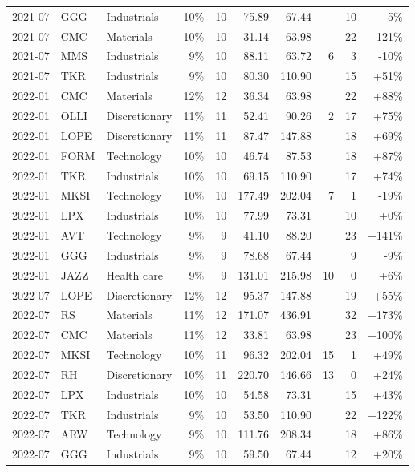 \documentclass[11pt,a4paper]{article}
\begin{document}
{\begin{longtable}{l l l r r r r r r r}
2021-07 & GGG & Industrials & 10\% & 10 & 75.89 & 67.44 &  & 10 & -5\% \\
2021-07 & CMC & Materials & 10\% & 10 & 31.14 & 63.98 &  & 22 & +121\% \\
2021-07 & MMS & Industrials & 9\% & 10 & 88.11 & 63.72 & 6 & 3 & -10\% \\
2021-07 & TKR & Industrials & 9\% & 10 & 80.30 & 110.90 &  & 15 & +51\% \\
2022-01 & CMC & Materials & 12\% & 12 & 36.34 & 63.98 &  & 22 & +88\% \\
2022-01 & OLLI & Discretionary & 11\% & 11 & 52.41 & 90.26 & 2 & 17 & +75\% \\
2022-01 & LOPE & Discretionary & 11\% & 11 & 87.47 & 147.88 &  & 18 & +69\% \\
2022-01 & FORM & Technology & 10\% & 10 & 46.74 & 87.53 &  & 18 & +87\% \\
2022-01 & TKR & Industrials & 10\% & 10 & 69.15 & 110.90 &  & 17 & +74\% \\
2022-01 & MKSI & Technology & 10\% & 10 & 177.49 & 202.04 & 7 & 1 & -19\% \\
2022-01 & LPX & Industrials & 10\% & 10 & 77.99 & 73.31 &  & 10 & +0\% \\
2022-01 & AVT & Technology & 9\% & 9 & 41.10 & 88.20 &  & 23 & +141\% \\
2022-01 & GGG & Industrials & 9\% & 9 & 78.68 & 67.44 &  & 9 & -9\% \\
2022-01 & JAZZ & Health care & 9\% & 9 & 131.01 & 215.98 & 10 & 0 & +6\% \\
2022-07 & LOPE & Discretionary & 12\% & 12 & 95.37 & 147.88 &  & 19 & +55\% \\
2022-07 & RS & Materials & 11\% & 12 & 171.07 & 436.91 &  & 32 & +173\% \\
2022-07 & CMC & Materials & 11\% & 12 & 33.81 & 63.98 &  & 23 & +100\% \\
2022-07 & MKSI & Technology & 10\% & 11 & 96.32 & 202.04 & 15 & 1 & +49\% \\
2022-07 & RH & Discretionary & 10\% & 11 & 220.70 & 146.66 & 13 & 0 & +24\% \\
2022-07 & LPX & Industrials & 10\% & 10 & 54.58 & 73.31 &  & 15 & +43\% \\
2022-07 & TKR & Industrials & 9\% & 10 & 53.50 & 110.90 &  & 22 & +122\% \\
2022-07 & ARW & Technology & 9\% & 10 & 111.76 & 208.34 &  & 18 & +86\% \\
2022-07 & GGG & Industrials & 9\% & 10 & 59.50 & 67.44 &  & 12 & +20\% \\

\end{longtable}}
\end{document}
